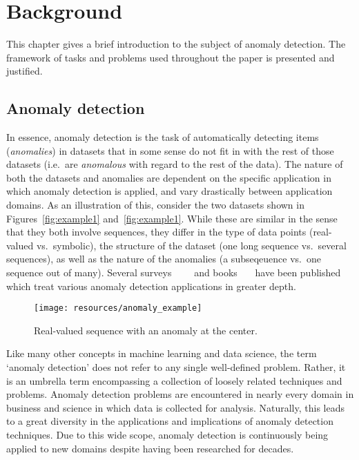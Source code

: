 \chapter{Background}
\label{ch:background}

This chapter gives a brief introduction to the subject of anomaly detection. The framework of tasks and problems used throughout the paper is presented and justified.

\section{Anomaly detection}
\label{sect:adb}

In essence, anomaly detection is the task of automatically detecting items (\emph{anomalies}) in datasets that in some sense do not fit in with the rest of those datasets (i.e.\ are \emph{anomalous} with regard to the rest of the data). The nature of both the datasets and anomalies are dependent on the specific application in which anomaly detection is applied, and vary drastically between application domains. As an illustration of this, consider the two datasets shown in Figures~\ref{fig:example1} and~\ref{fig:example1}. While these are similar in the sense that they both involve sequences, they differ in the type of data points (real-valued vs.\ symbolic), the structure of the dataset (one long sequence vs.\ several sequences), as well as the nature of the anomalies (a subseqeuence vs.\ one sequence out of many). Several surveys~\cite{hodge}~\cite{bakar}~\cite{chandola}~\cite{agyemang} and books~\cite{barnett}~\cite{hawkins}~\cite{leroy} have been published which treat various anomaly detection applications in greater depth.

\begin{figure}[htb]
    \centering
    \texttt{[image: resources/anomaly\_example]}
    \caption{\small Real-valued sequence with an anomaly at the center.}
    \vspace{-0pt}
\label{fig:example2}
\end{figure}

Like many other concepts in machine learning and data science, the term `anomaly detection' does not refer to any single well-defined problem. Rather, it is an umbrella term encompassing a collection of loosely related techniques and problems. Anomaly detection problems are encountered in nearly every domain in business and science in which data is collected for analysis. Naturally, this leads to a great diversity in the applications and implications of anomaly detection techniques. Due to this wide scope, anomaly detection is continuously being applied to new domains despite having been researched for decades.

